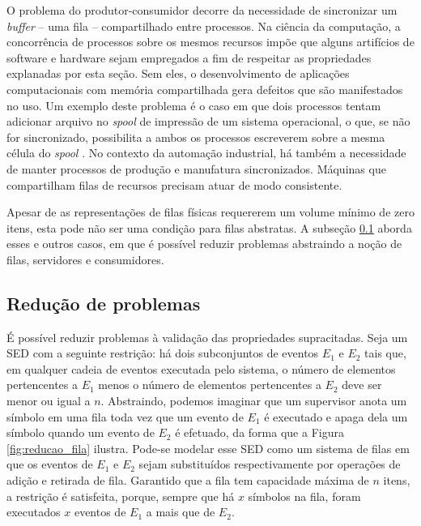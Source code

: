 O problema do produtor-consumidor decorre da necessidade de sincronizar um \textit{buffer} -- uma fila -- compartilhado entre processos. Na ciência da computação, a concorrência de processos sobre os mesmos recursos impõe que alguns artifícios de software e hardware sejam empregados a fim de respeitar as propriedades explanadas por esta seção. Sem eles, o desenvolvimento de aplicações computacionais com memória compartilhada gera defeitos que são manifestados no uso. Um exemplo deste problema é o caso em que dois processos tentam adicionar arquivo no \textit{spool} de impressão de um sistema operacional, o que, se não for sincronizado, possibilita a ambos os processos escreverem sobre a mesma célula do \textit{spool} \cite{tanenbaum}. No contexto da automação industrial, há também a necessidade de manter processos de produção e manufatura sincronizados. Máquinas que compartilham filas de recursos precisam atuar de modo consistente. 

Apesar de as representações de filas físicas requererem um volume mínimo de zero itens, esta pode não ser uma condição para filas abstratas. A subseção \ref{subsec:reducao} aborda esses e outros casos, em que é possível reduzir problemas abstraindo a noção de filas, servidores e consumidores.

\subsection{Redução de problemas}
\label{subsec:reducao}

É possível reduzir problemas à validação das propriedades supracitadas. Seja um SED com a seguinte restrição: há dois subconjuntos de eventos $E_1$ e $E_2$ tais que, em qualquer cadeia de eventos executada pelo sistema, o número de elementos pertencentes a $E_1$ menos o número de elementos pertencentes a $E_2$ deve ser menor ou igual a $n$. Abstraindo, podemos imaginar que um supervisor anota um símbolo em uma fila toda vez que um evento de $E_1$ é executado e apaga dela um símbolo quando um evento de $E_2$ é efetuado, da forma que a Figura \ref{fig:reducao_fila} ilustra. Pode-se modelar esse SED como um sistema de filas em que os eventos de $E_1$ e $E_2$ sejam substituídos respectivamente por operações de adição e retirada de fila. Garantido que a fila tem capacidade máxima de $n$ itens, a restrição é satisfeita, porque, sempre que há $x$ símbolos na fila, foram executados $x$ eventos de $E_1$ a mais que de $E_2$.


